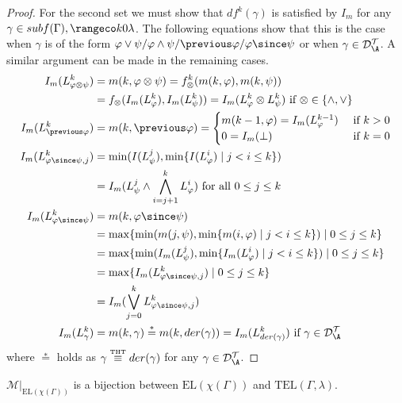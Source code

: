 \begin{proof}
  For the second set we must show that $df^k(\gamma)$ is satisfied by
  $I_m$ for any $\gamma \in subf(\Gamma), \kinlambda$. The following
  equations show that this is the case when $\gamma$ is of the form
  $\varphi \lor \psi/\varphi \land \psi/\previous \varphi/\varphi
  \since \psi$ or when $\gamma \in \langdat$. A similar argument can
  be made in the remaining cases.
  \begin{align*}
  I_m(L^k_{\varphi \otimes \psi}) &= m(k,\varphi \otimes \psi) = f_{\otimes}^k(m(k,\varphi),m(k,\psi))\\
  &= f_{\otimes}(I_m(L^k_\varphi),I_m(L^k_\psi)) = I_m(L^k_{\varphi} \otimes L^k_{\psi}) \text{ if } \otimes \in \{ \land, \lor \}\\
  I_m(L^k_{\previous \varphi}) &= m(k,\previous \varphi) = \begin{cases}
    m(k-1,\varphi)=I_m(L^{k-1}_\varphi) &\text{ if } k > 0\\
    0=I_m(\bot) &\text{ if } k = 0
  \end{cases}\\
    I_m(L_{\varphi \since \psi,j}^k) &= \min (I(L^j_{\psi}), \min \{I(L^i_{\varphi}) \mid j<i \leq k\})\\
                                  &= I_m(L_\psi^j \wedge \bigwedge_{i=j+1}^{k}L_{\varphi}^i) \text{ for all } 0 \leq j \leq k\\
    I_m(L^k_{\varphi \since \psi})
                                  &= m(k,\varphi \since \psi)\\
                                  &= \max \{\min (m(j, \psi), \min \{m(i, \varphi) \mid j<i \leq k\}) \mid 0 \leq j \leq k\}\\
                                  &= \max \{\min (I_m(L^j_{\psi}), \min \{I_m(L^i_{\varphi}) \mid j<i \leq k\}) \mid 0 \leq j \leq k\} \\
                                  &= \max \{ I_m(L_{\varphi \since \psi,j}^k) \mid 0 \leq j \leq k \} \\
                                  &= I_m(\bigvee_{j=0}^{k} L_{\varphi \since \psi,j}^k )\\
    I_m(L^k_{\gamma}) &= m(k,\gamma) \stackrel{*}{=} m(k,der(\gamma)) = I_m(L^k_{der(\gamma)}) \text{ if } \gamma \in \langdat
  \end{align*}
  where $\stackrel{*}{=}$ holds as $\gamma \stackrel{\normalfont\mbox{\tiny THT}}{\equiv} der(\gamma)$ for
  any $\gamma \in \langdat$.
\end{proof}

\begin{corollary}\label{cor:bijection-of-sm}
  $\mathcal{M}\vert_{\text{EL}(\chi(\Gamma))}$ is a bijection
  between $\text{EL}(\chi(\Gamma))$ and $\text{TEL}(\Gamma,\lambda)$.
\end{corollary}

